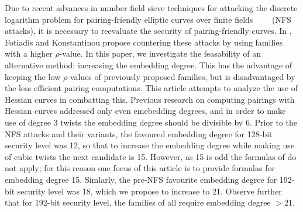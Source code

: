 Due to recent advances in number field sieve techniques for attacking the discrete logarithm problem for pairing-friendly elliptic curves over finite fields~\cite{2013/jouxP}~\cite{2016/KB}~\cite{2015/BGGM}~\cite{2015/BGK} (NFS attacks),
it is necessary to reevaluate the security of pairing-friendly curves.
In \cite{2018/FK}, Fotiadis and Konstantinou propose countering these attacks by using families with a higher $\rho$-value. 
In this paper, we investigate the feasability of an alternative method: increasing the embedding degree.
This has the advantage of keeping the low $\rho$-values of previously proposed families, but is disadvantaged by the less efficient pairing computations.
This article attempts to analyze the use of Hessian curves in combatting this.
Previous research on computing pairings with  Hessian curves addressed only even emebedding degrees, and in order to make use of degree 3 twists the embedding degree should be divisible by 6. 
Prior to the NFS attacks and their variants, the favoured embedding degree for 128-bit security level was 12, 
so that to increase the embedding degree while making use of cubic twists the next
candidate is 15. However, as 15 is odd the formulas of \cite{2010/Gu} do not apply;
for this reason one focus of this article is to provide formulas for embedding degree 15. Simlarly, the pre-NFS favourite embedding degree for 192-bit security level was 18, which we propose to increase to 21.
Observe further that for 192-bit security level, the families of \cite{2018/FK} all require embedding degree $>21$.




